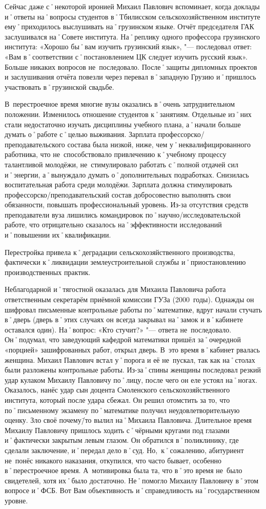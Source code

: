 Сейчас даже с˚некоторой иронией Михаил Павлович вспоминает, когда доклады и˚ответы на˚вопросы студентов в˚Тбилисском сельскохозяйственном институте ему˚приходилось выслушивать на˚грузинском языке. Отчёт председателя ГАК заслушивался на˚Совете института. На˚реплику одного профессора грузинского института: «Хорошо бы˚вам изучить грузинский язык», "--- последовал ответ: «Вам в˚соответствии с˚постановлением ЦК следует изучить русский язык». Больше никаких вопросов не~последовало. После˚защиты дипломных проектов и заслушивания отчёта повезли через перевал в˚западную Грузию и˚пришлось участвовать в˚грузинской свадьбе.

В~перестроечное время многие вузы оказались в˚очень затруднительном положении. Изменилось отношение студентов к˚занятиям. Отдельные из˚них стали недостаточно изучать дисциплины учебного плана, а˚начали больше думать о˚работе с˚целью выживания. Зарплата профессорско\-/преподавательского состава была низкой, ниже, чем у˚неквалифицированного работника, что не~способствовало привлечению к˚учебному процессу талантливой молодёжи, не~стимулировало работать с˚полной отдачей сил и˚энергии, а˚вынуждало думать о˚дополнительных подработках. Снизилась воспитательная работа среди молодёжи. Зарплата должна стимулировать профессорско\-/преподавательский состав добросовестно выполнять свои обязанности, повышать профессиональный уровень. Из-за отсутствия средств преподаватели вуза лишились командировок по˚научно\-/исследовательской работе, что отрицательно сказалось на˚эффективности исследований и˚повышении их˚квалификации. 

Перестройка привела к˚деградации сельскохозяйственного производства, фактически к˚ликвидации землеустроительной службы и˚приостановлению производственных практик. 

Неблагодарной и˚тягостной оказалась для Михаила Павловича работа ответственным секретарём приёмной комиссии ГУЗа (2000~годы). Однажды он шифровал письменные контрольные работы по˚математике, вдруг начали стучать в˚дверь (дверь в˚этих случаях он всегда закрывал на˚замок и в˚кабинете оставался один). На˚вопрос: «Кто стучит?» "--- ответа не~последовало. Он˚подумал, что заведующий кафедрой математики пришёл за˚очередной «порцией» зашифрованных работ, открыл дверь. В~это время в˚кабинет рвалась женщина. Михаил Павлович встал у˚порога и её не~пускал, так как на˚столах были разложены контрольные работы. Из-за˚спины женщины последовал резкий удар кулаком Михаилу Павловичу по˚лицу, после чего он еле устоял на˚ногах. Оказалось, нанёс удар сын доцента Смоленского сельскохозяйственного института, который после удара сбежал. Он решил отомстить за то, что по˚письменному экзамену по˚математике получил неудовлетворительную оценку. Зло своё почему\=/то вылил на˚Михаила Павловича. Длительное время Михаилу Павловичу пришлось ходить с˚чёрными кругами под глазами и˚фактически закрытым левым глазом. Он обратился в˚поликлинику, где сделали заключение, и˚передал дело в˚суд. Но,~к˚сожалению, абитуриент не~понёс никакого наказания, откупился, что часто бывает, особенно в˚перестроечное время. А~мотивировка была та, что в˚это время не~было свидетелей, хотя их˚было достаточно. Не˚помогло Михаилу Павловичу в˚этом вопросе и˚ФСБ. Вот Вам объективность и˚справедливость на˚государственном уровне.

